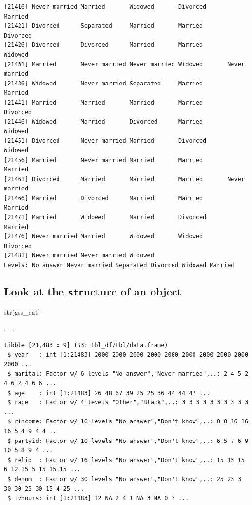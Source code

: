 \documentclass[
  letterpaper,
  DIV=11,
  numbers=noendperiod,
  oneside]{scrartcl}
\newenvironment{Shaded}{\begin{snugshade}}{\end{snugshade}}
\newcommand{\FunctionTok}[1]{\textcolor[rgb]{0.28,0.35,0.67}{#1}}
\newcommand{\NormalTok}[1]{\textcolor[rgb]{0.00,0.23,0.31}{#1}}
\begin{document}
\begin{verbatim}
[21416] Never married Married       Widowed       Divorced      Married      
[21421] Divorced      Separated     Married       Married       Divorced     
[21426] Divorced      Divorced      Married       Married       Widowed      
[21431] Married       Never married Never married Widowed       Never married
[21436] Widowed       Never married Separated     Married       Married      
[21441] Married       Married       Married       Married       Divorced     
[21446] Widowed       Married       Divorced      Married       Widowed      
[21451] Divorced      Never married Married       Divorced      Widowed      
[21456] Married       Never married Married       Married       Married      
[21461] Divorced      Married       Married       Married       Never married
[21466] Married       Divorced      Married       Married       Married      
[21471] Married       Widowed       Married       Divorced      Married      
[21476] Never married Married       Widowed       Widowed       Divorced     
[21481] Never married Never married Widowed      
Levels: No answer Never married Separated Divorced Widowed Married
\end{verbatim}

\hypertarget{look-at-the-structure-of-an-object}{%
\subsection{\texorpdfstring{Look at the \texttt{str}ucture of an
object}{Look at the structure of an object}}\label{look-at-the-structure-of-an-object}}

\begin{Shaded}
\begin{Highlighting}[]
\FunctionTok{str}\NormalTok{(gss\_cat)}
\end{Highlighting}
\end{Shaded}

. . .

\begin{verbatim}
tibble [21,483 x 9] (S3: tbl_df/tbl/data.frame)
 $ year   : int [1:21483] 2000 2000 2000 2000 2000 2000 2000 2000 2000 2000 ...
 $ marital: Factor w/ 6 levels "No answer","Never married",..: 2 4 5 2 4 6 2 4 6 6 ...
 $ age    : int [1:21483] 26 48 67 39 25 25 36 44 44 47 ...
 $ race   : Factor w/ 4 levels "Other","Black",..: 3 3 3 3 3 3 3 3 3 3 ...
 $ rincome: Factor w/ 16 levels "No answer","Don't know",..: 8 8 16 16 16 5 4 9 4 4 ...
 $ partyid: Factor w/ 10 levels "No answer","Don't know",..: 6 5 7 6 9 10 5 8 9 4 ...
 $ relig  : Factor w/ 16 levels "No answer","Don't know",..: 15 15 15 6 12 15 5 15 15 15 ...
 $ denom  : Factor w/ 30 levels "No answer","Don't know",..: 25 23 3 30 30 25 30 15 4 25 ...
 $ tvhours: int [1:21483] 12 NA 2 4 1 NA 3 NA 0 3 ...
\end{verbatim}
\end{document}
